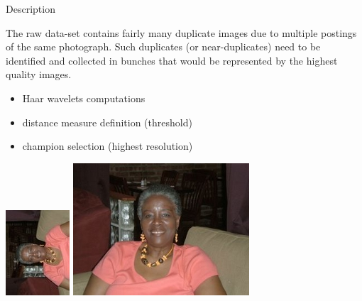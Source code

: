 
\begin{xpsectionbox}{Description}{}

The raw data-set contains fairly many duplicate images due to multiple postings of the same photograph. Such duplicates (or near-duplicates) need to be identified and collected in bunches that would be represented by the highest quality images.

\begin{minipage}{0.4\linewidth}

\begin{itemize}
	  \item Haar wavelets computations
	  \item distance measure definition (threshold)
	  \item champion selection (highest resolution)
\end{itemize}
\end{minipage}
\begin{minipage}{0.6\linewidth}

\begin{center}
			\includegraphics[height=0.25\linewidth]{images/NearDupScaleRot}
			\includegraphics[height=0.25\linewidth]{images/NearDupScale}
\end{center}

\end{minipage}
\end{xpsectionbox}

